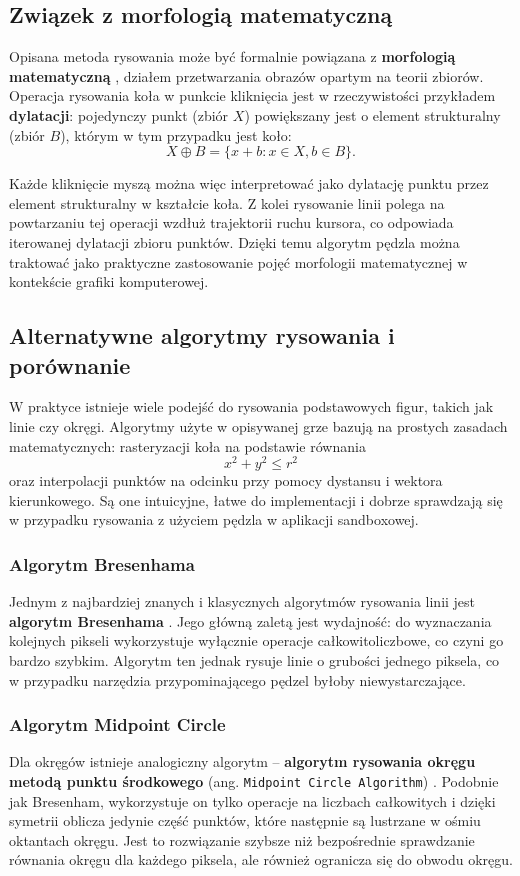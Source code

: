 \documentclass[a4paper,12pt]{book} %
\begin{document}
\subsection{Związek z morfologią matematyczną}

Opisana metoda rysowania może być formalnie powiązana z \textbf{morfologią matematyczną} \cite{Morfologia_1, Morfologia_2}, działem przetwarzania obrazów opartym na teorii zbiorów. 
Operacja rysowania koła w punkcie kliknięcia jest w rzeczywistości przykładem \textbf{dylatacji}: pojedynczy punkt (zbiór $X$) powiększany jest o element strukturalny (zbiór $B$), którym w tym przypadku jest koło:
\[
X \oplus B = \{ x + b : x \in X, b \in B \}.
\]

Każde kliknięcie myszą można więc interpretować jako dylatację punktu przez element strukturalny w kształcie koła. 
Z kolei rysowanie linii polega na powtarzaniu tej operacji wzdłuż trajektorii ruchu kursora, co odpowiada iterowanej dylatacji zbioru punktów. 
Dzięki temu algorytm pędzla można traktować jako praktyczne zastosowanie pojęć morfologii matematycznej w kontekście grafiki komputerowej.

\subsection{Alternatywne algorytmy rysowania i porównanie}

W praktyce istnieje wiele podejść do rysowania podstawowych figur, takich jak linie czy okręgi. 
Algorytmy użyte w opisywanej grze bazują na prostych zasadach matematycznych: rasteryzacji koła na podstawie równania 
\[
x^2 + y^2 \leq r^2
\]
oraz interpolacji punktów na odcinku przy pomocy dystansu i wektora kierunkowego. 
Są one intuicyjne, łatwe do implementacji i dobrze sprawdzają się w przypadku rysowania z użyciem pędzla w aplikacji sandboxowej. 

\subsubsection*{Algorytm Bresenhama}
Jednym z najbardziej znanych i klasycznych algorytmów rysowania linii jest \textbf{algorytm Bresenhama} \cite{Bresenham}. 
Jego główną zaletą jest wydajność: do wyznaczania kolejnych pikseli wykorzystuje wyłącznie operacje całkowitoliczbowe, co czyni go bardzo szybkim. 
Algorytm ten jednak rysuje linie o grubości jednego piksela, co w przypadku narzędzia przypominającego pędzel byłoby niewystarczające. 

\subsubsection*{Algorytm Midpoint Circle}
Dla okręgów istnieje analogiczny algorytm – \textbf{algorytm rysowania okręgu metodą punktu środkowego} (ang. \texttt{Midpoint Circle Algorithm}) \cite{Midpoint_circle}. 
Podobnie jak Bresenham, wykorzystuje on tylko operacje na liczbach całkowitych i dzięki symetrii oblicza jedynie część punktów, które następnie są lustrzane w ośmiu oktantach okręgu. 
Jest to rozwiązanie szybsze niż bezpośrednie sprawdzanie równania okręgu dla każdego piksela, ale również ogranicza się do obwodu okręgu.
\end{document}
